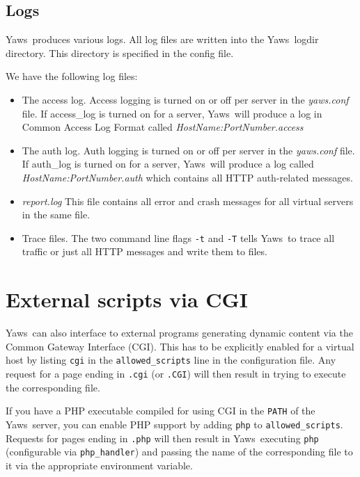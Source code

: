 \documentclass[11pt,oneside,english]{book}
\newcommand{\Yaws}            %
        {{\sc Yaws}}
\begin{document}
\section{Logs}
\Yaws\ produces various logs. All log files are written into the
\Yaws\ logdir directory. This directory is specified in the config
file.

We have the following log files:

\begin{itemize}
\item The access log. Access logging is turned on or off per server in
  the \textit{yaws.conf} file. If access\_log is turned on for a
  server, \Yaws\ will produce a log in Common Access Log Format called
  \textit{HostName:PortNumber.access}

\item The auth log. Auth logging is turned on or off per server in the
  \textit{yaws.conf} file. If auth\_log is turned on for a server,
  \Yaws\ will produce a log called \textit{HostName:PortNumber.auth}
  which contains all HTTP auth-related messages.

\item \textit{report.log} This file contains all error and crash
  messages for all virtual servers in the same file.

\item Trace files. The two command line flags \verb+-t+ and \verb+-T+ tells
\Yaws\ to trace all traffic or just all HTTP messages and write them to files.
\end{itemize}


\chapter{External scripts via CGI}

\Yaws\  can also interface to external programs generating dynamic
content via the Common Gateway Interface (CGI).  This has to be
explicitly enabled for a virtual host by listing \verb+cgi+ in the
\verb+allowed_scripts+ line in the configuration file.  Any request
for a page ending in \verb+.cgi+ (or \verb+.CGI+) will then result in
trying to execute the corresponding file.

If you have a PHP executable compiled for using CGI in the \verb+PATH+
of the \Yaws\  server, you can enable PHP support by adding \verb+php+ to
\verb+allowed_scripts+.  Requests for pages ending in \verb+.php+ will
then result in \Yaws\  executing \verb+php+ (configurable via
\verb+php_handler+) and passing the name of the corresponding file to
it via the appropriate environment variable.
\end{document}
